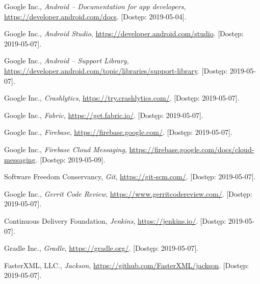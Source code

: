 \documentclass{pracamgr}
\let\cleardoublepage\clearpage
\begin{document}
\cleardoublepage
{}
{}
\listoftables


\begin{thebibliography}{99}


 Google Inc., \textit{Android -- Documentation for app developers},
	 \url{https://developer.android.com/docs}. [Dostęp: 2019-05-04].

 Google Inc., \textit{Android Studio},
	\url{https://developer.android.com/studio}. [Dostęp: 2019-05-07].

 Google Inc., \textit{Android -- Support Library},
	\url{https://developer.android.com/topic/libraries/support-library}. [Dostęp: 2019-05-07].

 Google Inc., \textit{Crashlytics}, \url{https://try.crashlytics.com/}. [Dostęp: 2019-05-07].

 Google Inc., \textit{Fabric}, \url{https://get.fabric.io/}. [Dostęp: 2019-05-07].

 Google Inc., \textit{Firebase}, \url{https://firebase.google.com/}. [Dostęp: 2019-05-07].

 Google Inc., \textit{Firebase Cloud Messaging},
	\url{https://firebase.google.com/docs/cloud-messaging}. [Dostęp: 2019-05-09].

 Software Freedom Conservancy, \textit{Git},
	\url{https://git-scm.com/}. [Dostęp: 2019-05-07].

 Google Inc., \textit{Gerrit Code Review},
	\url{https://www.gerritcodereview.com/}. [Dostęp: 2019-05-07].

 Continuous Delivery Foundation, \textit{Jenkins},
	\url{https://jenkins.io/}. [Dostęp: 2019-05-07].

 Gradle Inc., \textit{Gradle}, \url{https://gradle.org/}. [Dostęp: 2019-05-07].

 FasterXML, LLC., \textit{Jackson},
	\url{https://github.com/FasterXML/jackson}. [Dostęp: 2019-05-07].


\end{thebibliography}
\end{document}
